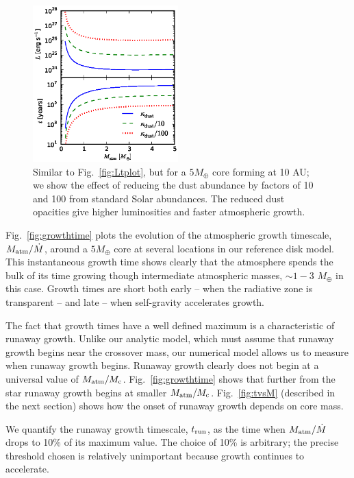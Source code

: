 \documentclass[apj, numberedappendix]{emulateapj}
\newcommand{\Fig}[1]{Fig.~\ref{#1}}
\newcommand{\co}{_{\rm c}}
\begin{document}
\begin{figure}[tb]
\centering
\includegraphics[width=0.5\textwidth]{../../figs/ModelAtmospheres/RadSelfGravPoly/PaperFigs/opacity_effect.eps}
\caption{Similar to \Fig{fig:Ltplot}, but for a $5 M_{\oplus}$ core forming at 10 AU; we show the effect of reducing the dust abundance by factors of 10 and 100 from standard Solar abundances. The reduced dust opacities give higher luminosities and faster atmospheric growth.}  %
\label{fig:LtvsMopacity}
\end{figure}

\Fig{fig:growthtime} plots the evolution of the atmospheric growth timescale, $M_{\rm atm}/\dot{M}$,  around a $5 M_{\oplus}$ core at several locations in our reference disk model.  This instantaneous growth time shows clearly that the atmosphere spends the bulk of its time growing though intermediate atmospheric masses, $\sim 1 -3$ $M_\oplus$ in this case.  Growth times are short both early -- when the radiative zone is transparent -- and late -- when self-gravity accelerates growth.  

The fact that growth times have a well defined maximum is a characteristic of runaway growth.  Unlike our analytic model, which must assume that runaway growth begins near the crossover mass, our numerical model allows us to measure when runaway growth begins.  Runaway growth clearly does not begin at a universal value of $M_{\rm atm}/M\co$.  \Fig{fig:growthtime} shows that further from the star runaway growth begins at smaller $M_{\rm atm}/M\co$.  \Fig{fig:tvsM} (described in the next section) shows how the onset of runaway growth depends on core mass. 

We quantify the runaway growth timescale, $t_{\rm run}$, as the time when $M_{\rm atm}/\dot{M}$ drops to 10\% of its maximum value.  The choice of 10\% is arbitrary; the precise threshold chosen is relatively unimportant because growth continues to accelerate.
\end{document}
